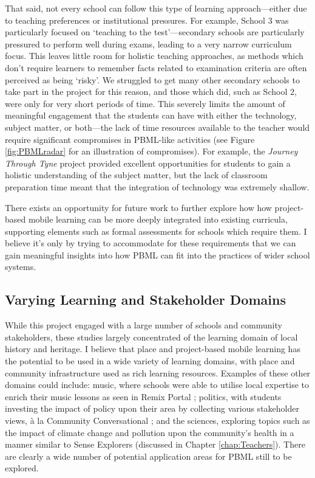 That said, not every school can follow this type of learning approach---either due to teaching preferences or institutional pressures. For example, School 3 was particularly focused on `teaching to the test'---secondary schools are particularly pressured to perform well during exams, leading to a very narrow curriculum focus. This leaves little room for holistic teaching approaches, as methods which don't require learners to remember facts related to examination criteria are often perceived as being `risky'. We struggled to get many other secondary schools to take part in the project for this reason, and those which did, such as School 2, were only for very short periods of time. This severely limits the amount of meaningful engagement that the students can have with either the technology, subject matter, or both---the lack of time resources available to the teacher would require significant compromises in PBML-like activities (see Figure \ref{fig:PBMLradar} for an illustration of compromises). For example, the \textit{Journey Through Tyne} project provided excellent opportunities for students to gain a holistic understanding of the subject matter, but the lack of classroom preparation time meant that the integration of technology was extremely shallow.

There exists an opportunity for future work to further explore how how project-based mobile learning can be more deeply integrated into existing curricula, supporting elements such as formal assessments for schools which require them. I believe it's only by trying to accommodate for these requirements that we can gain meaningful insights into how PBML can fit into the practices of wider school systems. 

\subsection*{Varying Learning and Stakeholder Domains}

While this project engaged with a large number of schools and community stakeholders, these studies largely concentrated of the learning domain of local history and heritage. I believe that place and project-based mobile learning has the potential to be used in a wide variety of learning domains, with place and community infrastructure used as rich learning resources. Examples of these other domains could include: music, where schools were able to utilise local expertise to enrich their music lessons as seen in Remix Portal \citep{Dodds2017}; politics, with students investing the impact of policy upon their area by collecting various stakeholder views, \`a la Community Conversational \citep{Johnson2017}; and the sciences, exploring topics such as the impact of climate change and pollution upon the community's health in a manner similar to Sense Explorers (discussed in Chapter \ref{chap:Teachers}). There are clearly a wide number of potential application areas for PBML still to be explored.


